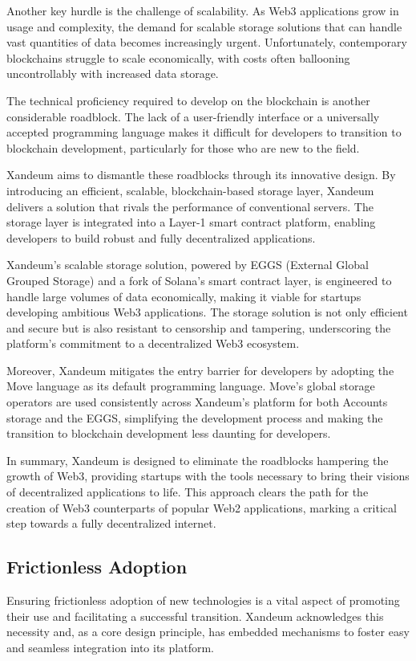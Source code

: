 \documentclass[11pt]{article}   	%
\begin{document}
Another key hurdle is the challenge of scalability. As Web3 applications grow in usage and complexity, the demand for scalable storage solutions that can handle vast quantities of data becomes increasingly urgent. Unfortunately, contemporary blockchains struggle to scale economically, with costs often ballooning uncontrollably with increased data storage.

The technical proficiency required to develop on the blockchain is another considerable roadblock. The lack of a user-friendly interface or a universally accepted programming language makes it difficult for developers to transition to blockchain development, particularly for those who are new to the field.

Xandeum aims to dismantle these roadblocks through its innovative design. By introducing an efficient, scalable, blockchain-based storage layer, Xandeum delivers a solution that rivals the performance of conventional servers. The storage layer is integrated into a Layer-1 smart contract platform, enabling developers to build robust and fully decentralized applications.

Xandeum's scalable storage solution, powered by EGGS (External Global Grouped Storage) and a fork of Solana's smart contract layer, is engineered to handle large volumes of data economically, making it viable for startups developing ambitious Web3 applications. The storage solution is not only efficient and secure but is also resistant to censorship and tampering, underscoring the platform's commitment to a decentralized Web3 ecosystem.

Moreover, Xandeum mitigates the entry barrier for developers by adopting the Move language as its default programming language. Move's global storage operators are used consistently across Xandeum's platform for both Accounts storage and the EGGS, simplifying the development process and making the transition to blockchain development less daunting for developers.

In summary, Xandeum is designed to eliminate the roadblocks hampering the growth of Web3, providing startups with the tools necessary to bring their visions of decentralized applications to life. This approach clears the path for the creation of Web3 counterparts of popular Web2 applications, marking a critical step towards a fully decentralized internet.

\subsection{Frictionless Adoption}
Ensuring frictionless adoption of new technologies is a vital aspect of promoting their use and facilitating a successful transition. Xandeum acknowledges this necessity and, as a core design principle, has embedded mechanisms to foster easy and seamless integration into its platform.
\end{document}
